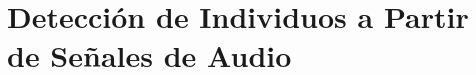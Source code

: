 \chapter{Detección de Individuos a Partir de Señales de Audio}\label{chapter: VRP}



























